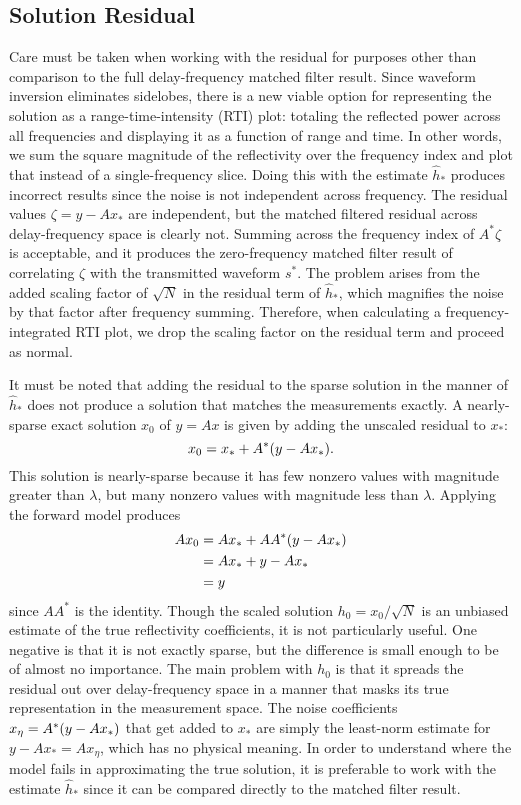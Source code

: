 \subsection{Solution Residual}
Care must be taken when working with the residual for purposes other than comparison to the full delay-frequency matched filter result. Since waveform inversion eliminates sidelobes, there is a new viable option for representing the solution as a range-time-intensity (RTI) plot: totaling the reflected power across all frequencies and displaying it as a function of range and time. In other words, we sum the square magnitude of the reflectivity over the frequency index and plot that instead of a single-frequency slice. Doing this with the estimate $\hat{h}_*$ produces incorrect results since the noise is not independent across frequency. The residual values $\zeta = y - Ax_*$ are independent, but the matched filtered residual across delay-frequency space is clearly not. Summing across the frequency index of $A^*\zeta$ is acceptable, and it produces the zero-frequency matched filter result of correlating $\zeta$ with the transmitted waveform $s^*$. The problem arises from the added scaling factor of $\sqrt{N}$ in the residual term of $\hat{h}_*$, which magnifies the noise by that factor after frequency summing. Therefore, when calculating a frequency-integrated RTI plot, we drop the scaling factor on the residual term and proceed as normal.

It must be noted that adding the residual to the sparse solution in the manner of $\hat{h}_*$ does not produce a solution that matches the measurements exactly. A nearly-sparse exact solution $x_0$ of $y=Ax$ is given by adding the unscaled residual to $x_*$:
\begin{equation}
 x_0 = x_* + A^*\paren*{y - Ax_*}.
\end{equation}
This solution is nearly-sparse because it has few nonzero values with magnitude greater than $\lambda$, but many nonzero values with magnitude less than $\lambda$. Applying the forward model produces
\begin{align}
 Ax_0 &= Ax_* + AA^*\paren*{y - Ax_*}\nonumber\\
 &= Ax_* + y - Ax_*\nonumber\\
 &= y
\end{align}
since $AA^*$ is the identity. Though the scaled solution $h_0 = x_0/\sqrt{N}$ is an unbiased estimate of the true reflectivity coefficients, it is not particularly useful. One negative is that it is not exactly sparse, but the difference is small enough to be of almost no importance. The main problem with $h_0$ is that it spreads the residual out over delay-frequency space in a manner that masks its true representation in the measurement space. The noise coefficients $x_\eta = A^*\paren*{y - Ax_*}$ that get added to $x_*$ are simply the least-norm estimate for $y - Ax_* = Ax_\eta$, which has no physical meaning. In order to understand where the model fails in approximating the true solution, it is preferable to work with the estimate $\hat{h}_*$ since it can be compared directly to the matched filter result.

